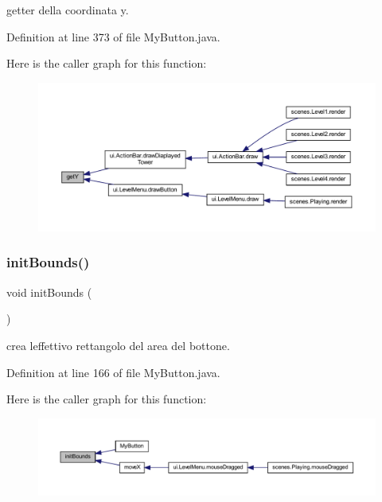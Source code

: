 getter della coordinata y. 



Definition at line 373 of file My\+Button.\+java.

Here is the caller graph for this function\+:\nopagebreak
\begin{figure}[H]
\begin{center}
\leavevmode
\includegraphics[width=350pt]{classui_1_1_my_button_aab81944f0a14bba932c0931899951937_icgraph}
\end{center}
\end{figure}
\mbox{\label{classui_1_1_my_button_a4d3160e53a5224ffdf578694846b19b3}} 
\subsubsection{\texorpdfstring{init\+Bounds()}{initBounds()}}
{\footnotesize\ttfamily void init\+Bounds (\begin{DoxyParamCaption}{ }\end{DoxyParamCaption})\hspace{0.3cm}{\ttfamily [private]}}



crea l\textquotesingle{}effettivo rettangolo del area del bottone. 



Definition at line 166 of file My\+Button.\+java.

Here is the caller graph for this function\+:\nopagebreak
\begin{figure}[H]
\begin{center}
\leavevmode
\includegraphics[width=350pt]{classui_1_1_my_button_a4d3160e53a5224ffdf578694846b19b3_icgraph}
\end{center}
\end{figure}
\mbox{\label{classui_1_1_my_button_a2deebd864f1c01a6d81238349c929885}} 

